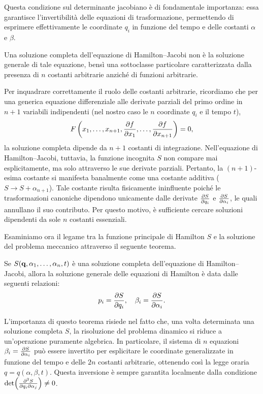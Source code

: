 Questa condizione sul determinante jacobiano è di fondamentale importanza: essa garantisce l'invertibilità delle equazioni di trasformazione, permettendo di esprimere effettivamente le coordinate $q_i$ in funzione del tempo e delle costanti $\alpha$ e $\beta$.

\begin{remark}
    Una soluzione completa dell'equazione di Hamilton--Jacobi non è la soluzione generale di tale equazione, bensì una sottoclasse particolare caratterizzata dalla presenza di $n$ costanti arbitrarie anziché di funzioni arbitrarie.
\end{remark}

Per inquadrare correttamente il ruolo delle costanti arbitrarie, ricordiamo che per una generica equazione differenziale alle derivate parziali del primo ordine in $n+1$ variabili indipendenti (nel nostro caso le $n$ coordinate $q_i$ e il tempo $t$),
\begin{equation*}
    F\left(x_1, \dots, x_{n+1}, \pdv{f}{x_1}, \dots, \pdv{f}{x_{n+1}}\right) = 0,
\end{equation*}
la soluzione completa dipende da $n+1$ costanti di integrazione. Nell'equazione di Hamilton--Jacobi, tuttavia, la funzione incognita $S$ non compare mai esplicitamente, ma solo attraverso le sue derivate parziali. Pertanto, la $(n+1)$-esima costante si manifesta banalmente come una costante additiva ($S \to S + \alpha_{n+1}$). Tale costante risulta fisicamente ininfluente poiché le trasformazioni canoniche dipendono unicamente dalle derivate $\pdv{S}{q_i}$ e $\pdv{S}{\alpha_i}$, le quali annullano il suo contributo. Per questo motivo, è sufficiente cercare soluzioni dipendenti da sole $n$ costanti essenziali.

Esaminiamo ora il legame tra la funzione principale di Hamilton $S$ e la soluzione del problema meccanico attraverso il seguente teorema.
\begin{theorem}[Jacobi]
    Se $S(\vb{q},\alpha_1, \dots, \alpha_n, t)$ è una soluzione completa dell'equazione di Hamilton--Jacobi, allora la soluzione generale delle equazioni di Hamilton è data dalle seguenti relazioni:
    \begin{equation*}
        p_i = \pdv{S}{q_i}, \quad \beta_i = \pdv{S}{\alpha_i}.
    \end{equation*}
\end{theorem}

L'importanza di questo teorema risiede nel fatto che, una volta determinata una soluzione completa $S$, la risoluzione del problema dinamico si riduce a un'operazione puramente algebrica. In particolare, il sistema di $n$ equazioni $\beta_i = \pdv{S}{\alpha_i}$ può essere invertito per esplicitare le coordinate generalizzate in funzione del tempo e delle $2n$ costanti arbitrarie, ottenendo così la legge oraria $q = q(\alpha, \beta, t)$. Questa inversione è sempre garantita localmente dalla condizione $\det(\pdv[2]{S}{q_i}{\alpha_j}) \neq 0$.

